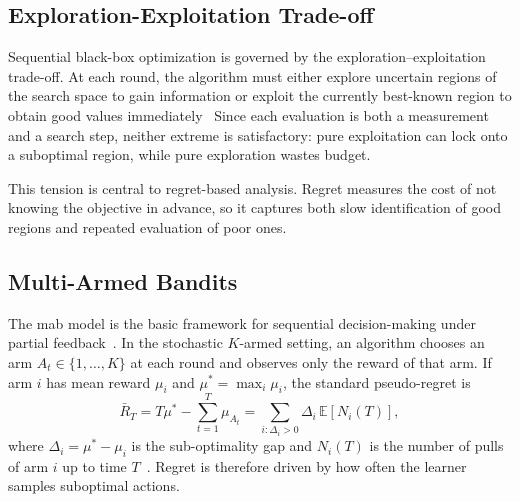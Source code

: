 \subsection{Exploration-Exploitation Trade-off}

Sequential black-box optimization is governed by the
exploration--exploitation trade-off. At each round, the algorithm
must either explore uncertain regions of the search space to gain
information or exploit the currently best-known region to obtain good
values
immediately~\cite{cesa2006prediction,bubeck2012regret,lattimore2020bandit}
Since each evaluation is both a measurement and a search step,
neither extreme is satisfactory: pure exploitation can lock onto a
suboptimal region, while pure exploration wastes budget.

This tension is central to regret-based analysis. Regret measures the
cost of not knowing the objective in advance, so it captures both
slow identification of good regions and repeated evaluation of poor ones.

\subsection{Multi-Armed Bandits}
The \acrfull{mab} model is the basic framework for sequential
decision-making under partial
feedback~\cite{bubeck2012regret,lattimore2020bandit}. In the
stochastic $K$-armed setting, an algorithm chooses an arm $A_t \in
\{1,\dots,K\}$ at each round and observes only the reward of that
arm. If arm $i$ has mean reward $\mu_i$ and $\mu^*=\max_i \mu_i$, the
standard pseudo-regret is
\[
  \bar{R}_T = T\mu^* - \sum_{t=1}^{T} \mu_{A_t}
  = \sum_{i:\Delta_i>0} \Delta_i \, \mathbb{E}[N_i(T)],
\]
where $\Delta_i=\mu^*-\mu_i$ is the sub-optimality gap and $N_i(T)$ is
the number of pulls of arm $i$ up to time
$T$~\cite{bubeck2012regret,lattimore2020bandit}. Regret is therefore
driven by how often the learner samples suboptimal actions.


